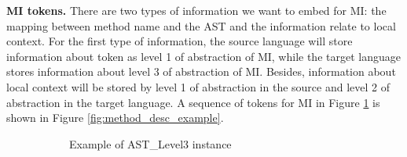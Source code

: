 \textbf{MI tokens.} There are two types of information we want to embed for MI: the mapping between method name and the AST and the information relate to local context. For the first type of information, the source language will store information about token as level 1 of abstraction of MI, while the target language stores information about level 3 of abstraction of MI. Besides, information about local context will be stored by level 1 of abstraction in the source and level 2 of abstraction in the target language. A sequence of tokens for MI in Figure \ref{fig:mapping_expression} is shown in Figure \ref{fig:method_desc_example}.
 \noindent
\begin{figure}
    \centering
      \begin{subfigure}{0.3\textwidth}
        \caption{Example of AST\_Level3 instance}
        \label{fig:mapping_expression} 
      \end{subfigure}
      \hfill
      \begin{subfigure}[t]{0.3\textwidth}
\end{subfigure}
\end{figure}
